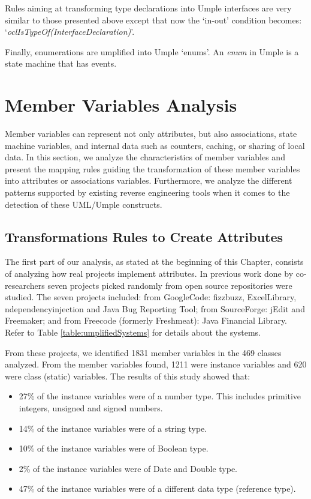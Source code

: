 Rules aiming at transforming type declarations into Umple interfaces are very similar to those presented above except that now the `in-out' condition becomes: 
\newline
`\textit{oclIsTypeOf(InterfaceDeclaration)}'.

Finally, enumerations are umplified into Umple `enums'. An \textit{enum} in Umple is a state machine that has events.

\section{Member Variables Analysis}
Member variables can represent not only attributes, but also associations, state machine variables, and internal data such as counters, caching, or sharing of local data. In this section, we analyze the characteristics of member variables and present the mapping rules guiding the transformation of
these member variables into attributes or associations variables. Furthermore, we analyze the different patterns supported by existing reverse engineering tools when it comes to the detection of these UML/Umple constructs. 

\subsection{Transformations Rules to Create Attributes}
The first part of our analysis, as stated at the beginning of this Chapter, consists of analyzing how real projects implement attributes. In previous work done by co-researchers \cite{UmpleAttributes} seven projects picked randomly from open source repositories were studied. The seven projects included: from GoogleCode: fizzbuzz, ExcelLibrary, ndependencyinjection and Java Bug Reporting Tool; from SourceForge: jEdit and Freemaker; and from Freecode (formerly Freshmeat): Java Financial Library.
Refer to Table \ref{table:umplifiedSystems} for details about the systems. 

From these projects, we identified 1831 member variables in the 469 classes analyzed. From the member variables found, 1211 were instance variables and 620 were class (static) variables. The results of this study showed that:

\begin{itemize}
\item 27\% of the instance variables were of a number type. This includes primitive integers, unsigned and signed numbers.
\item 14\% of the instance variables were of a string type. 
\item 10\% of the instance variables were of Boolean type.
\item 2\% of the instance variables were of Date and Double type.
\item 47\% of the instance variables were of a different data type (reference type).
\end{itemize}

